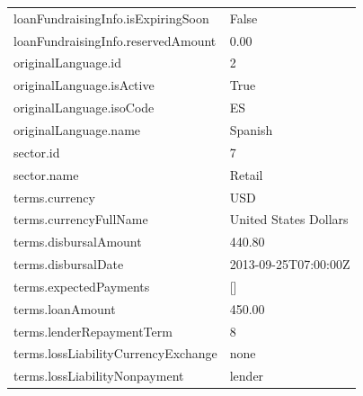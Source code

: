 \begin{longtable}{|p{}|p{}|}
    loanFundraisingInfo.isExpiringSoon   & False                                                               \\
    loanFundraisingInfo.reservedAmount   & 0.00                                                                \\
    originalLanguage.id                  & 2                                                                   \\
    originalLanguage.isActive            & True                                                                \\
    originalLanguage.isoCode             & ES                                                                  \\
    originalLanguage.name                & Spanish                                                             \\
    sector.id                            & 7                                                                   \\
    sector.name                          & Retail                                                              \\
    terms.currency                       & USD                                                                 \\
    terms.currencyFullName               & United States Dollars                                               \\
    terms.disbursalAmount                & 440.80                                                              \\
    terms.disbursalDate                  & 2013-09-25T07:00:00Z                                                \\
    terms.expectedPayments               & {[}{]}                                                              \\
    terms.loanAmount                     & 450.00                                                              \\
    terms.lenderRepaymentTerm            & 8                                                                   \\
    terms.lossLiabilityCurrencyExchange  & none                                                                \\
    terms.lossLiabilityNonpayment        & lender                                                              \\

\end{longtable}
